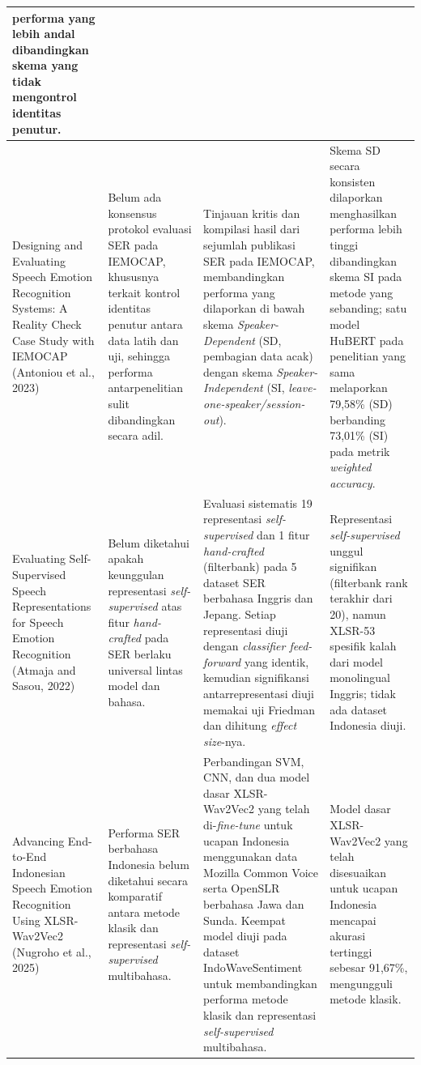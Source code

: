 {\begin{longtable}{|p{}|p{}|p{}|p{}|}
    performa yang lebih andal dibandingkan skema yang tidak mengontrol
    identitas penutur.
    \\
    \hline
    Designing and Evaluating Speech Emotion Recognition Systems: A
    Reality Check Case Study with IEMOCAP (Antoniou et al., 2023)
    &
    Belum ada konsensus protokol evaluasi SER pada IEMOCAP, khususnya
    terkait kontrol identitas penutur antara data latih dan uji,
    sehingga performa antarpenelitian sulit dibandingkan secara adil.
    &
    Tinjauan kritis dan kompilasi hasil dari sejumlah publikasi SER pada
    IEMOCAP, membandingkan performa yang dilaporkan di bawah skema
    \emph{Speaker-Dependent} (SD, pembagian data acak) dengan skema
    \emph{Speaker-Independent} (SI, \emph{leave-one-speaker/session-out}).
    &
    Skema SD secara konsisten dilaporkan menghasilkan performa lebih
    tinggi dibandingkan skema SI pada metode yang sebanding; satu model
    HuBERT pada penelitian yang sama melaporkan 79,58\% (SD) berbanding
    73,01\% (SI) pada metrik \emph{weighted accuracy}.
    \\
    \hline
    Evaluating Self-Supervised Speech Representations for Speech
    Emotion Recognition (Atmaja and Sasou, 2022)
    &
    Belum diketahui apakah keunggulan representasi \emph{self-supervised}
    atas fitur \emph{hand-crafted} pada SER berlaku universal lintas model dan
    bahasa.
    &
    Evaluasi sistematis 19 representasi \emph{self-supervised} dan 1
    fitur \emph{hand-crafted} (filterbank) pada 5 dataset SER berbahasa Inggris dan
    Jepang. Setiap representasi diuji dengan \emph{classifier
    feed-forward} yang identik, kemudian signifikansi antarrepresentasi
    diuji memakai uji Friedman dan dihitung \emph{effect size}-nya.
    &
    Representasi \emph{self-supervised} unggul signifikan (filterbank
    rank terakhir dari 20), namun XLSR-53 spesifik kalah dari model
    monolingual Inggris; tidak ada dataset Indonesia diuji.
    \\
    \hline
    Advancing End-to-End Indonesian Speech Emotion Recognition Using
    XLSR-Wav2Vec2 (Nugroho et al., 2025)
    &
    Performa SER berbahasa Indonesia belum diketahui secara komparatif
    antara metode klasik dan representasi \emph{self-supervised}
    multibahasa.
    &
    Perbandingan SVM, CNN, dan dua model dasar XLSR-Wav2Vec2 yang telah
    di-\emph{fine-tune} untuk ucapan Indonesia menggunakan data Mozilla
    Common Voice serta OpenSLR berbahasa Jawa dan Sunda. Keempat model
    diuji pada dataset IndoWaveSentiment untuk membandingkan performa
    metode klasik dan representasi \emph{self-supervised} multibahasa.
    &
    Model dasar XLSR-Wav2Vec2 yang telah disesuaikan untuk ucapan
    Indonesia mencapai akurasi tertinggi sebesar 91,67\%, mengungguli
    metode klasik.
    \\
\end{longtable}
}

